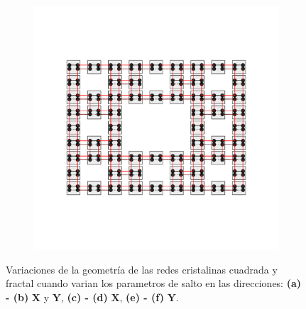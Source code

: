 \begin{figure}[h!]
\begin{minipage}[h!]{1.0\textwidth}
\begin{subfigure}[b!]{0.2 \textwidth}
         \end{subfigure}\hspace*{-0.5em}
         \begin{subfigure}[b!]{0.2 \textwidth}
             \caption*{}
             \includegraphics[width=\textwidth]{Imagenes/Models/Model_pump/fractal_pump_model_y_16.pdf}
         \end{subfigure}\hspace*{-0.5em}
     \end{minipage}\vspace*{-0.2em}     
    \caption{Variaciones de la geometría de las redes cristalinas cuadrada y fractal cuando varian los parametros de salto en las direcciones: \textbf{(a) - (b)} $\textbf{X}$ y $\textbf{Y}$, \textbf{(c) - (d)} $\textbf{X}$, \textbf{(e) - (f)} $\textbf{Y}$. }
    \label{fig:Model_pump}
\end{figure}